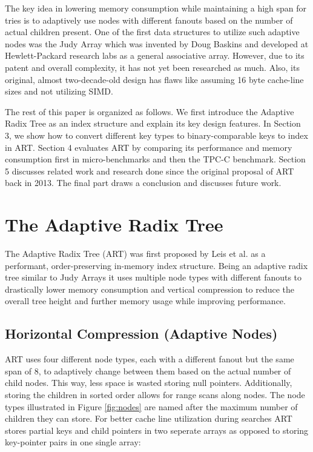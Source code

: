 \documentclass[acmtog, nonacm]{acmart}
\begin{document}
The key idea in lowering memory consumption while maintaining a high span for tries is to adaptively use nodes 
with different fanouts based on the number of actual children present. One of the first data structures to utilize such 
adaptive nodes was the Judy Array \cite{baskins2004judy} which was invented by Doug Baskins and developed at 
Hewlett-Packard research labs as a general associative array. However, due to its patent and overall complexity, 
it has not yet been researched as much. Also, its original, almost two-decade-old design has flaws like assuming 
16 byte cache-line sizes and not utilizing SIMD.

The rest of this paper is organized as follows. We first introduce the Adaptive Radix Tree as an index structure 
and explain its key design features. In Section 3, we show how to convert different key types to binary-comparable keys to 
index in ART. Section 4 evaluates ART by comparing its performance and memory consumption first in 
micro-benchmarks and then the TPC-C benchmark. Section 5 discusses related work and research done since the 
original proposal of ART back in 2013. The final part draws a conclusion and discusses future work.

\section{The Adaptive Radix Tree}

The Adaptive Radix Tree (ART) was first proposed by Leis et al. \cite{6544812} as a performant, order-preserving 
in-memory index structure. Being an adaptive radix tree similar to Judy Arrays it uses multiple node types 
with different fanouts to drastically lower memory consumption and vertical compression to reduce the overall tree 
height and further memory usage while improving performance.

\subsection{Horizontal Compression (Adaptive Nodes)}
ART uses four different node types, each with a different fanout but the same span 
of 8, to adaptively change between them based on the actual number of child nodes. This way, less space is wasted 
storing null pointers. Additionally, storing the children in sorted order allows for range scans along nodes. The node types 
illustrated in Figure \ref{fig:nodes} are named after the maximum number of children 
they can store. For better cache line utilization during searches ART stores partial keys and child pointers in two 
seperate arrays as opposed to storing key-pointer pairs in one single array:
\end{document}
